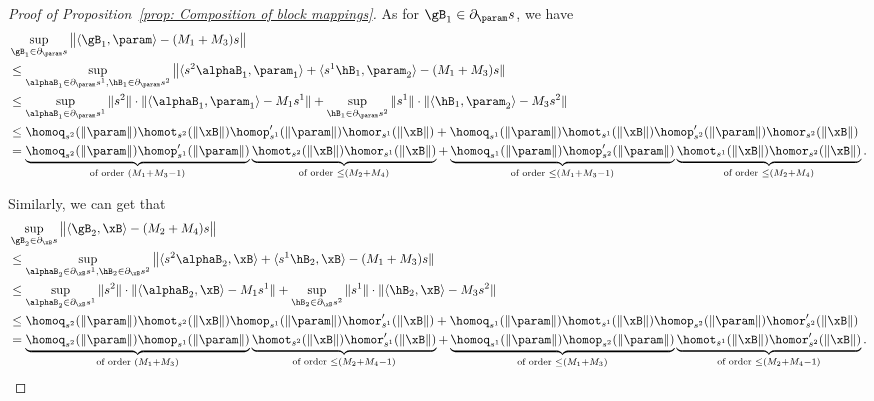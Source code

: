 \begin{proof}[Proof of Proposition~\ref{prop: Composition of block mappings}]
As for $ \gB_1  \in \partial_{\param} s$, we have 
\begin{align*}
&\sup_{\gB_1 \in \partial_{\param} s} \big \| \langle \gB_1, \param \rangle  - (M_1 +M_3) s \big \|
\\ 
&\le \sup_{\alphaB_1 \in \partial_{\param} s^1, \hB_1 \in \partial_{\param} s^2} \big \| \langle s^2 \alphaB_1, \param_1 \rangle  + \langle s^1 \hB_1, \param_2 \rangle - (M_1 + M_3) s \| 
\\ 
&\le \sup_{\alphaB_1 \in \partial_{\param} s^1} \|s^2\| \cdot \| \langle \alphaB_1, \param_1\rangle  - M_1 s^1 \| + \sup_{\hB_1 \in \partial_{\param} s^2} \|s^1\| \cdot \| \langle \hB_1, \param_2\rangle  - M_3 s^2 \| 
\\ 
&\le \homoq_{s^2}(\|\param\|) \homot_{s^2}(\|\xB\|) \homop_{s^1}^\prime (\|\param\|) \homor_{s^1}(\|\xB\|) + \homoq_{s^1}(\|\param\|) \homot_{s^1}(\|\xB\|) \homop_{s^2}^\prime (\|\param\|) \homor_{s^2}(\|\xB\|) \\ 
&= \underbrace{\homoq_{s^2}(\|\param\|)  \homop_{s^1}^\prime (\|\param\|)}_{ \text{of order } (M_1 +M_3-1)} \underbrace{\homot_{s^2}(\|\xB\|)\homor_{s^1}(\|\xB\|)}_{ \text{of order } \le (M_2 +M_4)} + \underbrace{\homoq_{s^1}(\|\param\|) \homop_{s^2}^\prime (\|\param\|)}_{ \text{of order } \le (M_1 +M_3-1)}  \underbrace{\homot_{s^1}(\|\xB\|)\homor_{s^2}(\|\xB\|)}_{ \text{of order } \le (M_2 +M_4)}.
\end{align*}

Similarly, we can get that 
\begin{align*}
    &\sup_{\gB_2 \in \partial_{\xB} s} \big \| \langle \gB_2, \xB \rangle  - (M_2 +M_4) s \big \|
    \\ 
    &\le \sup_{\alphaB_2 \in \partial_{\xB} s^1, \hB_2 \in \partial_{\xB} s^2} \big \| \langle s^2 \alphaB_2, \xB \rangle  + \langle s^1 \hB_2, \xB \rangle - (M_1 + M_3) s \| 
    \\ 
    &\le \sup_{\alphaB_2 \in \partial_{\xB} s^1} \|s^2\| \cdot \| \langle \alphaB_2, \xB\rangle  - M_1 s^1 \| + \sup_{\hB_2 \in \partial_{\xB} s^2} \|s^1\| \cdot \| \langle \hB_2, \xB\rangle  - M_3 s^2 \| 
    \\ 
    &\le \homoq_{s^2}(\|\param\|) \homot_{s^2}(\|\xB\|) \homop_{s^1} (\|\param\|) \homor_{s^1}^\prime(\|\xB\|) + \homoq_{s^1}(\|\param\|) \homot_{s^1}(\|\xB\|) \homop_{s^2} (\|\param\|) \homor_{s^2}^\prime(\|\xB\|) \\ 
    &= \underbrace{\homoq_{s^2}(\|\param\|)  \homop_{s^1} (\|\param\|)}_{ \text{of order } (M_1 +M_3)} \underbrace{\homot_{s^2}(\|\xB\|)\homor_{s^1}^\prime(\|\xB\|)}_{ \text{of order } \le (M_2 +M_4-1)} + \underbrace{\homoq_{s^1}(\|\param\|) \homop_{s^2} (\|\param\|)}_{ \text{of order } \le (M_1 +M_3)}  \underbrace{\homot_{s^1}(\|\xB\|)\homor_{s^2}^\prime(\|\xB\|)}_{ \text{of order } \le (M_2 +M_4-1)}.
    \end{align*}


\end{proof}
